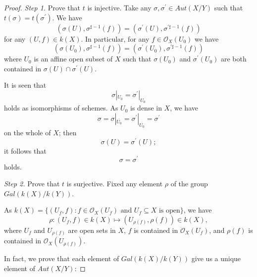 \documentclass[12pt,twoside,reqno]{amsart}
\theoremstyle{definition}
\numberwithin{equation}{section}
\begin{document}
\begin{proof}
\emph{Step 1.} Prove that ${t}$ is injective. Take any $\sigma ,\sigma
^{\prime }\in {Aut}\left( X/Y\right) $ such that $t\left( \sigma \right)
=t\left( \sigma ^{\prime }\right) .$ We have
\begin{equation*}
\left( \sigma \left( U\right) ,\sigma ^{\sharp -1}\left( f\right) \right)
=\left( \sigma ^{\prime }\left( U\right) ,\sigma ^{\prime \sharp -1}\left(
f\right) \right)
\end{equation*}for any $\left( U,f\right) \in k\left( X\right) .$ In particular, for any $f\in \mathcal{O}_{X}(U_{0})$ we have
\begin{equation*}
\left( \sigma \left( U_{0}\right) ,\sigma ^{\sharp -1}\left( f\right)
\right) =\left( \sigma ^{\prime }\left( U_{0}\right) ,\sigma ^{\prime \sharp
-1}\left( f\right) \right)
\end{equation*}where $U_{0}$ is an affine open subset of $X$ such that $\sigma \left(
U_{0}\right) $ and $\sigma ^{\prime }\left( U_{0}\right) $ are both
contained in $\sigma \left( U\right) \cap \sigma ^{\prime }\left( U\right) $.

It is seen that
\begin{equation*}
\sigma |_{U_{0}}=\sigma ^{\prime }|_{U_{0}}
\end{equation*}holds as isomorphisms of schemes. As $U_{0}$ is dense in $X$, we have
\begin{equation*}
\sigma =\sigma |_{\overline{U_{0}}}=\sigma ^{\prime }|_{\overline{U_{0}}}=\sigma ^{\prime }
\end{equation*}on the whole of $X$; then $$\sigma \left( U\right) =\sigma ^{\prime }\left(
U\right) ;$$ it follows that $$\sigma =\sigma ^{\prime }$$ holds.

\emph{Step 2.} Prove that ${t}$ is surjective. Fixed any element $\rho $ of
the group $Gal\left( k\left( X\right) /k\left( Y\right) \right) $.

As $k(X)=\{(U_{f},f):f\in \mathcal{O}_{X}(U_{f})\text{ and }U_{f}\subseteq X\text{ is open}\}$, we have
\begin{equation*}
\rho :\left( U_{f},f\right) \in k\left( X\right) \longmapsto \left( U_{\rho
\left( f\right) },\rho \left( f\right) \right) \in k\left( X\right) ,
\end{equation*}
where $U_{f}$ and $U_{\rho (f)}$ are open sets in $X$, $f$ is contained in $\mathcal{O}_{X}(U_{f})$, and $\rho (f)$ is contained in $\mathcal{O}_{X}(U_{\rho (f)})$.

In fact, we prove that each element of $Gal\left( k\left( X\right) /k\left(
Y\right) \right) $ give us a unique element of ${Aut}(X/Y)$:


\end{proof}
\end{document}
